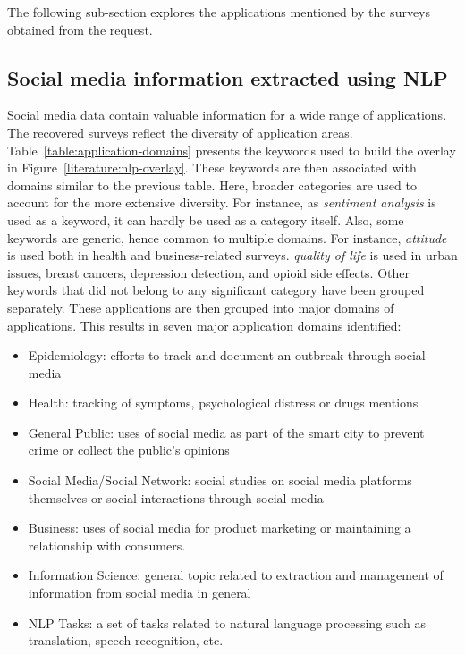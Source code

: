 The following sub-section explores the applications mentioned by the surveys obtained from the request.

\subsection{Social media information extracted using NLP}
Social media data contain valuable information for a wide range of applications.
The recovered surveys reflect the diversity of application areas.
Table~\ref{table:application-domains} presents the keywords used to build the overlay in Figure~\ref{literature:nlp-overlay}.
These keywords are then associated with domains similar to the previous table.
Here, broader categories are used to account for the more extensive diversity.
For instance, as \emph{sentiment analysis} is used as a keyword, it can hardly be used as a category itself.
Also, some keywords are generic, hence common to multiple domains.
For instance, \emph{attitude} is used both in health and business-related surveys.
\emph{quality of life} is used in urban issues, breast cancers, depression detection, and opioid side effects.
Other keywords that did not belong to any significant category have been grouped separately.
These applications are then grouped into major domains of applications.
This results in seven major application domains identified:

\begin{itemize}
    \item Epidemiology: efforts to track and document an outbreak through social media
    \item Health: tracking of symptoms, psychological distress or drugs mentions
    \item General Public: uses of social media as part of the smart city to prevent crime or collect the public's opinions
    \item Social Media/Social Network: social studies on social media platforms themselves or social interactions through social media
    \item Business: uses of social media for product marketing or maintaining a relationship with consumers.
    \item Information Science: general topic related to extraction and management of information from social media in general
    \item NLP Tasks: a set of tasks related to natural language processing such as translation, speech recognition, etc.
\end{itemize}

